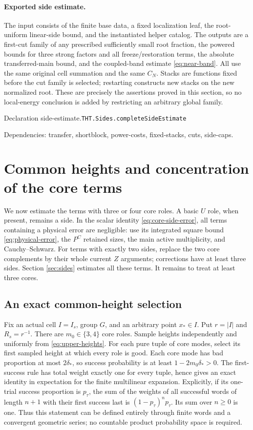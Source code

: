 \documentclass[11pt]{article}
\theoremstyle{definition}
\numberwithin{equation}{section}
\newcommand{\bp}[3]{\par\smallskip\begingroup\footnotesize
\noindent\hypertarget{bp:#1}{\textsf{Declaration #1.}}\quad\nolinkurl{#2}\par
\noindent\textsf{Dependencies:} #3.\par\endgroup\smallskip}
\begin{document}
\paragraph{Exported side estimate.}
The input consists of the finite base data, a fixed localization leaf, the root-uniform linear-side bound, and the instantiated helper catalog. The outputs are a first-cut family of any prescribed sufficiently small root fraction, the powered bounds for three strong factors and all freeze/restoration terms, the absolute transferred-main bound, and the coupled-band estimate \eqref{eq:near-band}. All use the same original cell summation and the same $C_N$. Stacks are functions fixed before the cut family is selected; restarting constructs new stacks on the new normalized root. These are precisely the assertions proved in this section, so no local-energy conclusion is added by restricting an arbitrary global family.
\bp{side-estimate}{THT.Sides.completeSideEstimate}{transfer, shortblock, power-costs, fixed-stacks, cuts, side-caps}



\section{Common heights and concentration of the core terms}\label{sec:core}
We now estimate the terms with three or four core roles. A basic $U$ role, when present, remains a side. In the scalar identity \eqref{eq:core-side-error}, all terms containing a physical error are negligible: use its integrated square bound \eqref{eq:physical-error}, the $P^C$ retained sizes, the main active multiplicity, and Cauchy--Schwarz. For terms with exactly two sides, replace the two core complements by their whole current $Z$ arguments; corrections have at least three sides. Section \ref{sec:sides} estimates all these terms. It remains to treat at least three cores.

\subsection*{An exact common-height selection}
Fix an actual cell $I=I_s$, group $G$, and an arbitrary point $x_*\in I$. Put $r=|I|$ and $R_s=r^{-1}$. There are $m_0\in\{3,4\}$ core roles. Sample heights independently and uniformly from \eqref{eq:upper-heights}. For each pure tuple of core modes, select its first sampled height at which every role is good. Each core mode has bad proportion at most $2\delta_*$, so success probability is at least $1-2m_0\delta_*>0$. The first-success rule has total weight exactly one for every tuple, hence gives an exact identity in expectation for the finite multilinear expansion. Explicitly, if its one-trial success proportion is $p_\tau$, the sum of the weights of all successful words of length $n+1$ with their first success last is $(1-p_\tau)^np_\tau$. Its sum over $n\ge0$ is one. Thus this statement can be defined entirely through finite words and a convergent geometric series; no countable product probability space is required.
\end{document}
